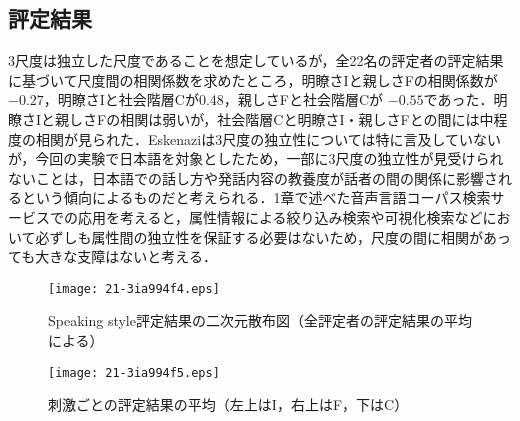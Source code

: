 \documentclass[japanese]{jnlp_1.4}
\begin{document}
\subsection{評定結果}

3尺度は独立した尺度であることを想定しているが，全22名の評定者の評定結果に基づいて尺度間の相関係数を求めたところ，明瞭さIと親しさFの相関係数が $-0.27$，明瞭さIと社会階層Cが0.48，親しさFと社会階層Cが $-0.55$であった．明瞭さIと親しさFの相関は弱いが，社会階層Cと明瞭さI・親しさFとの間には中程度の相関が見られた．Eskenaziは3尺度の独立性については特に言及していないが，今回の実験で日本語を対象としたため，一部に3尺度の独立性が見受けられないことは，日本語での話し方や発話内容の教養度が話者の間の関係に影響されるという傾向によるものだと考えられる．1章で述べた音声言語コーパス検索サービスでの応用を考えると，属性情報による絞り込み検索や可視化検索などにおいて必ずしも属性間の独立性を保証する必要はないため，尺度の間に相関があっても大きな支障はないと考える．

\begin{figure}[b]
\begin{center}
\texttt{[image: 21-3ia994f4.eps]}
\end{center}
\caption{Speaking style評定結果の二次元散布図（全評定者の評定結果の平均による）}
\end{figure}

\begin{figure}[b]
\begin{center}
\texttt{[image: 21-3ia994f5.eps]}
\end{center}
\caption{刺激ごとの評定結果の平均（左上はI，右上はF，下はC）}
\end{figure}
\end{document}
